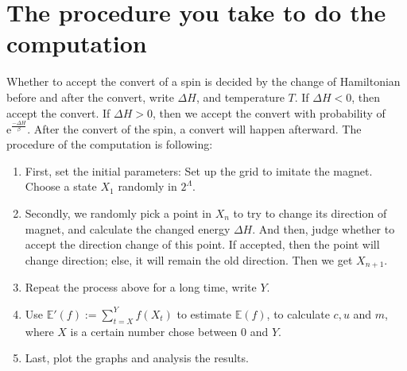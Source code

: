 \documentclass[11pt,openany]{book}              %
\begin{document}
\section{The procedure you take to do the computation}
Whether to accept the convert of a spin is decided by the change of Hamiltonian before and after the convert, write \(\Delta H\), and temperature \(T\).
If \(\Delta H<0\), then accept the convert.
If \(\Delta H > 0 \), then we accept the convert with probability of \(\mathrm{e}^{\frac{- \Delta H}{\beta}}\).
After the convert of the spin, a convert will happen afterward.
The procedure of the computation is following:
\begin{enumerate}
  \item First, set the initial parameters: Set up the grid to imitate the magnet.
    Choose a state \(X_1\) randomly in \(2^\Lambda\).
  \item Secondly, we randomly pick a point in \(X_n\) to try to change its direction of magnet, and calculate the changed energy \(\Delta H\).
    And then, judge whether to accept the direction change of this point.
    If accepted, then the point will change direction; else, it will remain the old direction. Then we get \(X_{n+1}\).
  \item Repeat the process above for a long time, write \(Y\).
  \item Use \(\mathbb{E}'( f):=\sum_{t=X}^{Y} f( X_t)\) to estimate \(\mathbb{E}( f)\), to calculate \(c,u\) and \(m\), where \(X\) is a certain number chose between \(0\) and \(Y\).
  \item Last, plot the graphs and analysis the results.
\end{enumerate}
\end{document}
